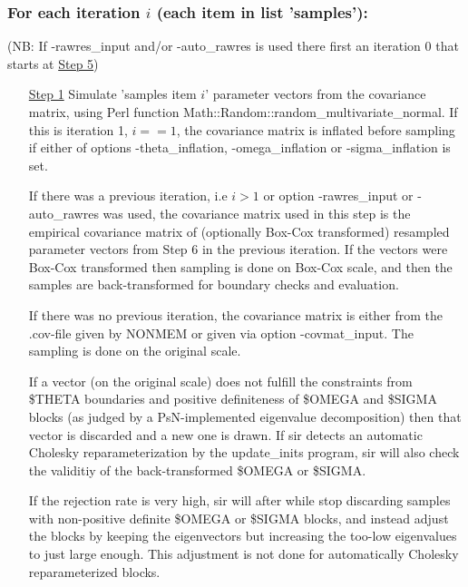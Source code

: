 \subsubsection*{For each iteration $i$ (each item in list 'samples'):}
(NB: If -rawres\_input and/or -auto\_rawres is used there first an iteration 0 that starts at \underline{Step 5})
\begin{itemize}
\item[\underline{Step 1}] 
Simulate 'samples item $i$' parameter vectors from the 
covariance matrix, using Perl function Math::Random::random\_multivariate\_normal.
If this is iteration 1, $i==1$, 
the covariance matrix is inflated before sampling 
if either of options -theta\_inflation, -omega\_inflation or -sigma\_inflation is set. 

\noindent If there was a previous iteration, i.e $i>1$ or option -rawres\_input or -auto\_rawres was used, 
the covariance matrix used in this step is the
empirical covariance matrix of (optionally Box-Cox transformed) resampled parameter vectors from
Step 6 in the previous iteration. 
If the vectors were Box-Cox transformed then
sampling is done on Box-Cox scale, and 
then the samples are back-transformed for boundary checks and evaluation.

\noindent If there was no previous iteration, the covariance matrix is either from
the .cov-file given by NONMEM or given via option -covmat\_input.
The sampling is done on the original scale. 

\noindent If a vector (on the original scale) does not fulfill the constraints from \$THETA boundaries
and positive definiteness of \$OMEGA and
\$SIGMA blocks (as judged by a PsN-implemented eigenvalue decomposition) 
then that vector is 
discarded and a new one is drawn. If sir detects an automatic Cholesky reparameterization
by the update\_inits program, sir will also check the validitiy of the back-transformed \$OMEGA or \$SIGMA.

\noindent If the rejection rate is very high, sir will after while stop discarding samples with non-positive definite
\$OMEGA or \$SIGMA blocks, and instead adjust the blocks by
keeping the eigenvectors but increasing the too-low eigenvalues to just large enough.
This adjustment is not done for automatically Cholesky reparameterized blocks.


\end{itemize}
